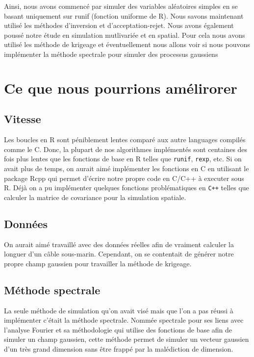 \documentclass[10pt]{article} %
\begin{document}
Ainsi, nous avons commencé par simuler des variables aléatoires simples en se basant
uniquement sur runif (fonction uniforme de R). Nous savons maintenant utilisé les méthodes
 d'inversion et d'acceptation-rejet. Nous avons également poussé notre étude en simulation
 mutlivariée et en spatial. Pour cela nous avons utilisé les méthode  de krigeage et éventuellement
 nous allons voir si nous pouvons implémenter la méthode spectrale pour simuler des processus gaussiens

\section{Ce que nous pourrions amélirorer}
\subsection{Vitesse}

Les boucles en R sont péniblement lentes comparé aux autre languages compilés comme le C. Donc, la plupart de nos algorithmes implémentés sont
centaines des fois plus lentes que les fonctions de base en R telles que \texttt{runif}, \texttt{rexp}, etc. Si on avait plus de temps,
on aurait aimé implémenter les fonctions en C en utilisant le package Rcpp qui permet d'écrire notre propre code en C/C++ à executer sous R. Déjà on a pu implémenter
quelques fonctions problématiques en \texttt{C++} telles que calculer la matrice de covariance pour la simulation spatiale.

\subsection{Données}

On aurait aimé travaillé avec des données réelles afin de vraiment calculer la longuer d'un câble sous-marin. Cependant, on se contentait de
générer notre propre champ gaussien pour travailler la méthode de krigeage.

\subsection{Méthode spectrale}

La seule méthode de simulation qu'on avait visé mais que l'on a pas réussi à implémenter c'était la méthode spectrale.
Nommée spectrale pour ses liens avec l'analyse Fourier et sa méthodologie qui utilise des fonctions de base afin de simuler
un champ gaussien, cette méthode permet de simuler un vecteur gaussien d'un très grand dimension sans être frappé par la malédiction
de dimension.
\end{document}
